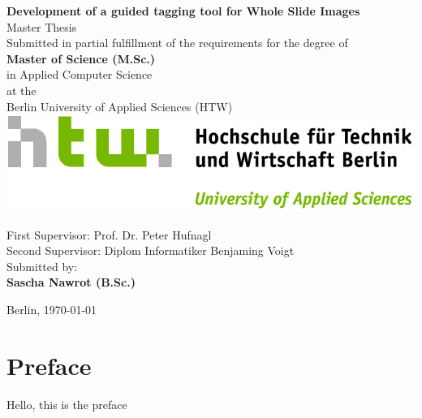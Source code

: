 \documentclass{report}
\begin{document}
\begin{titlepage}
	\centering
	{\huge\textbf{Development of a guided tagging tool for Whole Slide Images\\}}
	\vspace{1cm}
	{\huge Master Thesis\\}
	\vspace{2cm}
	{\large Submitted in partial fulfillment of the requirements for the degree
	of\\}
	\vspace{0.5cm}
	{\large \textbf{Master of Science (M.Sc.)}\\ 
	in Applied Computer Science\\}
	\vspace{0.5cm}
	{\large at the\\}
	\vspace{0.5cm}
	{\large Berlin University of Applied Sciences (HTW)\\}
	\vspace{0.5cm}
	\includegraphics[scale=1]{img/HTW_Logo_quer_rgb.jpg}
	\\
	\vspace{1cm}
	\raggedright
	{\large First Supervisor: Prof. Dr. Peter Hufnagl\\}
	\vspace{0.25cm}
	{\large Second Supervisor: Diplom Informatiker Benjaming Voigt\\}
	\centering
	\vspace{1.5cm}
	{\large Submitted by: \\}
	\vspace{0.25cm}
	{\large \textbf{Sascha Nawrot (B.Sc.)}}
	\vfill
		{\large Berlin, \today{}\par}
\end{titlepage}

\newpage
\chapter*{Preface}
Hello, this is the preface

\newpage
\begin{abstract}
This is the abstract.
\end{abstract}
\newpage

\tableofcontents
\newpage







\begin{appendices}
	
	
	
\end{appendices}




\listoffigures
\listoftables
\printnomenclature
\end{document}
